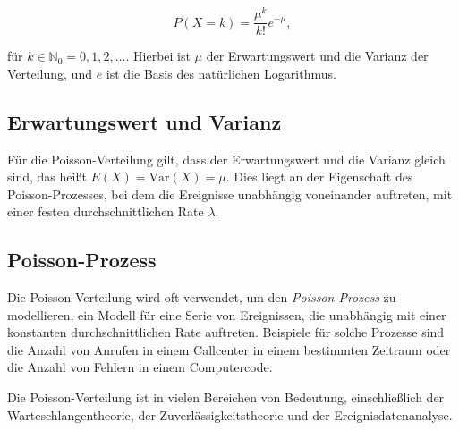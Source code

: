 \[
    P(X = k) = \frac{\mu^k}{k!}e^{-\mu},
\]

für $k \in \mathbb{N}_0 = 0, 1, 2, \dots$.
Hierbei ist $\mu$ der Erwartungswert und die Varianz der Verteilung, und $e$ ist die Basis des natürlichen Logarithmus.


\subsection{Erwartungswert und Varianz}

Für die Poisson-Verteilung gilt, dass der Erwartungswert und die Varianz gleich sind, das heißt $E(X) = \text{Var}(X) = \mu$.
Dies liegt an der Eigenschaft des Poisson-Prozesses, bei dem die Ereignisse unabhängig voneinander auftreten, mit einer festen durchschnittlichen Rate $\lambda$.

\subsection{Poisson-Prozess}

Die Poisson-Verteilung wird oft verwendet, um den \textit{Poisson-Prozess} zu modellieren, ein Modell für eine Serie von Ereignissen, die unabhängig mit einer konstanten durchschnittlichen Rate auftreten.
Beispiele für solche Prozesse sind die Anzahl von Anrufen in einem Callcenter in einem bestimmten Zeitraum oder die Anzahl von Fehlern in einem Computercode.

Die Poisson-Verteilung ist in vielen Bereichen von Bedeutung, einschließlich der Warteschlangentheorie, der Zuverlässigkeitstheorie und der Ereignisdatenanalyse.